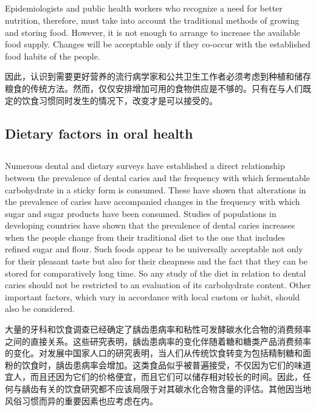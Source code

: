 \documentclass[]{article}
\begin{document}
\subsection{}
\begin{spacing}{2.0}
	{\Large Epidemiologists and public health workers who recognize a need for better nutrition, therefore, must take into account the traditional methods of growing and storing food. However, it is not enough to arrange to increase the available food supply. Changes will be acceptable only if they co-occur with the established food habits of the people.}\newline
\end{spacing}

因此，认识到需要更好营养的流行病学家和公共卫生工作者必须考虑到种植和储存粮食的传统方法。然而，仅仅安排增加可用的食物供应是不够的。只有在与人们既定的饮食习惯同时发生的情况下，改变才是可以接受的。

\subsection*{Dietary factors in oral health}
\subsection{}
\begin{spacing}{2.0}
	{\Large Numerous dental and dietary surveys have established a direct relationship between the prevalence of dental caries and the frequency with which fermentable carbohydrate in a sticky form is consumed. These have shown that alterations in the prevalence of caries have accompanied changes in the frequency with which sugar and sugar products have been consumed. Studies of populations in developing countries have shown that the prevalence of dental caries increases when the people	change from their traditional diet to the one that includes refined sugar and flour. Such foods appear to be universally acceptable not only for their pleasant taste but	also for their cheapness and the fact that they can be stored for comparatively long	time. So any study of the diet in relation to dental caries should not be restricted to an evaluation of its carbohydrate content. Other important factors, which vary in
	accordance with local custom or habit, should also be considered.}\newline
\end{spacing}

大量的牙科和饮食调查已经确定了龋齿患病率和粘性可发酵碳水化合物的消费频率之间的直接关系。这些研究表明，龋齿患病率的变化伴随着糖和糖类产品消费频率的变化。对发展中国家人口的研究表明，当人们从传统饮食转变为包括精制糖和面粉的饮食时，龋齿患病率会增加。这类食品似乎被普遍接受，不仅因为它们的味道宜人，而且还因为它们的价格便宜，而且它们可以储存相对较长的时间。因此，任何与龋齿有关的饮食研究都不应该局限于对其碳水化合物含量的评估。其他因当地风俗习惯而异的重要因素也应考虑在内。
\end{document}
